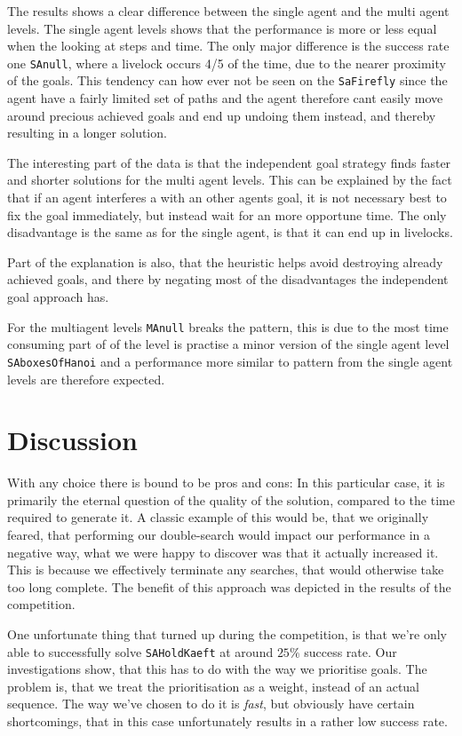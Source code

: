 \documentclass[letterpaper]{article}
\begin{document}
		The results shows a clear difference between the single agent and the multi agent levels. 
		The single agent levels shows that the performance is more or less equal when the looking at steps and time. The only major difference is the success rate one \verb=SAnull=, where a livelock occurs 4/5 of the time, due to the nearer proximity of the goals. This tendency can how ever not be seen on the \verb|SaFirefly| since the agent have a fairly limited set of paths and the agent therefore cant easily move around precious achieved goals and end up undoing them instead, and thereby resulting in a longer solution.
		
		The interesting part of the data is that the independent goal strategy finds faster and shorter solutions for the multi agent levels. This can be explained by the fact that if an agent interferes a with an other agents goal, it is not necessary best to fix the goal immediately, but instead wait for an more opportune time.	The only disadvantage is the same as for the single agent, is that it can end up in livelocks.
		
		Part of the explanation is also, that the heuristic helps avoid destroying already achieved goals, and there by negating most of the disadvantages the independent goal approach has. 
		
		For the multiagent levels \verb|MAnull| breaks the pattern, this is due to the most time consuming part of of the level is practise a minor version of the single agent level \verb|SAboxesOfHanoi| and a performance more similar to pattern from the single agent levels are therefore expected.
	
	
\section{Discussion}
	\label{disscussion}
	With any choice there is bound to be pros and cons: In this particular case, it is primarily the eternal question of the quality of the solution, compared to the time required to generate it. A classic example of this would be, that we originally feared, that performing our double-search would impact our performance in a negative way, what we were happy to discover was that it actually increased it. This is because we effectively terminate any searches, that would otherwise take too long complete. The benefit of this approach was depicted in the results of the competition. 

	One unfortunate thing that turned up during the competition, is that we're only able to successfully solve \verb=SAHoldKaeft= at around $25\%$ success rate. Our investigations show, that this has to do with the way we prioritise goals. The problem is, that we treat the prioritisation as a weight, instead of an actual sequence. The way we've chosen to do it is \emph{fast}, but obviously have certain shortcomings, that in this case unfortunately results in a rather low success rate. 
\end{document}

